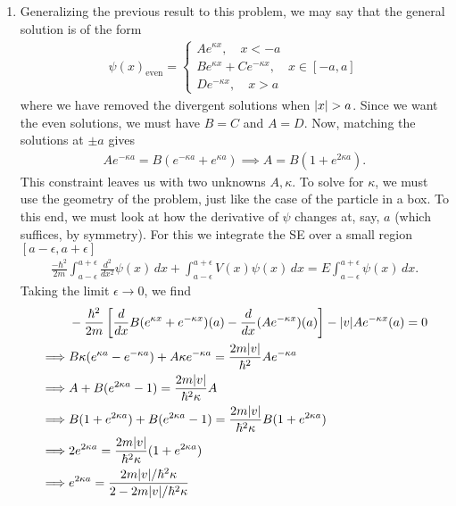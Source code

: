 \documentclass{article}
\theoremstyle{definition}
\newcommand{\f}[2]{\frac{#1}{#2}}
\newcommand{\lb}{\left[}
\newcommand{\rb}{\right]}
\begin{document}
\begin{enumerate}[label=(\alph*)]
	\item Generalizing the previous result to this problem, we may say that the general solution is of the form 
	\begin{align*}
	\boxed{\psi(x)_\text{even} = 
	\begin{cases}
	A e^{\kappa x}, \quad x < -a\\
	B e^{\kappa x} + Ce^{-\kappa x}, \quad x\in [-a,a] \\
	D e^{-\kappa x}, \quad x > a
	\end{cases}}
	\end{align*}
	where we have removed the divergent solutions when $\abs{x} > a$. Since we want the even solutions, we must have $B=C$ and $A=D$. Now, matching the solutions at $\pm a$ gives
	\begin{align*}
	A e^{-\kappa a} = B(e^{-\kappa a} + e^{\kappa a}) \implies A = B(1 + e^{2\kappa a}). 
	\end{align*}
	This constraint leaves us with two unknowns $A,\kappa$. To solve for $\kappa$, we must use the geometry of the problem, just like the case of the particle in a box. To this end, we must look at how the derivative of $\psi$ changes at, say, $a$ (which suffices, by symmetry). For this we integrate the SE over a small region $[a-\epsilon, a+\epsilon]$
	\begin{align*}
	\f{-\hbar^2}{2m}\int_{a-\epsilon}^{a+\epsilon} \f{d^2}{dx^2}\psi(x)\,dx + \int_{a-\epsilon}^{a+\epsilon} V(x)\psi(x)\,dx = E \int_{a-\epsilon}^{a+\epsilon} \psi(x)\,dx.
	\end{align*}
	Taking the limit $\epsilon \to 0$, we find 
	\begin{align*}
	&-\f{\hbar^2}{2m} \lb \f{d}{dx}B(e^{\kappa x} + e^{-\kappa x})(a) - \f{d}{dx}(Ae^{-\kappa x})(a) \rb - \abs{v} Ae^{-\kappa x}(a) = 0 \\
	\implies & B\kappa(e^{\kappa a } - e^{-\kappa a} ) + A\kappa e^{-\kappa a} = \f{2m\abs{v} }{\hbar^2}A e^{-\kappa a} \\
	\implies &  A+ B(e^{2\kappa a} - 1) = \f{2m\abs{v}}{\hbar^2 \kappa} A \\ 
	\implies & B(1 + e^{2\kappa a}) + B(e^{2\kappa a} - 1) = \f{2m\abs{v}}{\hbar^2 \kappa} B(1 + e^{2\kappa a})\\ 
	\implies & 2e^{2\kappa a} = \f{2m\abs{v}}{\hbar^2 \kappa} (1 + e^{2\kappa a})\\
	\implies & e^{2\kappa a} = \f{2m\abs{v}/\hbar^2 \kappa}{2-2m\abs{v}/\hbar^2\kappa} \\

\end{align*}
\end{enumerate}
\end{document}
